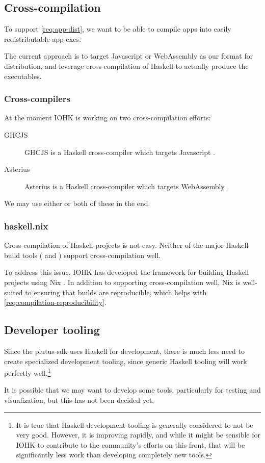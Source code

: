 \subsection{Cross-compilation}
\label{sec:cross-compilation}

To support \cref{req:app-dist}, we want to be able to compile \glspl{app} into easily redistributable \glspl{app-exe}.

The current approach is to target Javascript or WebAssembly as our format for distribution, and leverage cross-compilation of Haskell to actually produce the executables.

\subsubsection{Cross-compilers}

At the moment IOHK is working on two cross-compilation efforts:
\begin{description}
  \item[GHCJS] GHCJS is a Haskell cross-compiler which targets Javascript \autocite{ghcjs-repo}.
  \item[Asterius] Asterius is a Haskell cross-compiler which targets WebAssembly \autocite{asterius-repo}.
\end{description}

\noindent We may use either or both of these in the end.

\subsubsection{haskell.nix}

Cross-compilation of Haskell projects is not easy.
Neither of the major Haskell build tools ( and ) support cross-compilation well.

To address this issue, IOHK has developed the  framework for building Haskell projects using Nix \autocite{haskell-nix-repo}.
In addition to supporting cross-compilation well, Nix is well-suited to ensuring that builds are reproducible, which helps with \cref{req:compilation-reproducibility}.

\subsection{Developer tooling}
\label{sec:tooling}

Since the \gls{plutus-sdk} uses Haskell for development, there is much less need to create specialized development tooling, since generic Haskell tooling will work perfectly well.\footnote{
It is true that Haskell development tooling is generally considered to not be very good.
However, it is improving rapidly, and while it might be sensible for IOHK to contribute to the community's efforts on this front, that will be significantly less work than developing completely new tools.
}

It is possible that we may want to develop some tools, particularly for testing and visualization, but this has not been decided yet.
